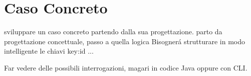 \chapter{Caso Concreto}
sviluppare un caso concreto partendo dalla sua progettazione.
parto da progettazione concettuale, passo a quella logica
Bisognerá strutturare in modo intelligente le chiavi
key:id ...

Far vedere delle possibili interrogazioni, magari in codice Java oppure con CLI.